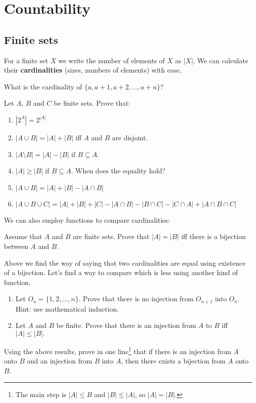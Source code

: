 \section{Countability}
\subsection{Finite sets}
For a finite set $X$ we write the number of elements of $X$ as $|X|$. We can calculate their \textbf{cardinalities} (sizes, numbers of elements) with
ease,
\begin{prob}
	What is the cardinality of $\{a, a+1, a+2, \dots, a+n\}$?
\end{prob}
\begin{prob}
	Let $A,\,B$ and $C$ be finite sets. Prove that:
	\begin{enumerate}
		\item $|2^A|=2^{|A|}$
		\item $|A\cup B|=|A|+|B|$ iff $A$ and $B$ are disjoint.
		\item $|A\setminus B|=|A|-|B|$ if $B\subseteq A.$
		\item $|A| \ge |B|$ if $B\subseteq A$. When does the equality hold?
		\item $|A\cup B| = |A| + |B| - |A\cap B|$
		\item $|A\cup B\cup C| = |A|+|B|+|C| - |A\cap B| - |B\cap C|-|C\cap A| + |A\cap B\cap C|$
	\end{enumerate}
\end{prob}
We can also employ functions to compare cardinalities:
\begin{prob}
	Assume that $A$ and $B$ are finite sets. Prove that $|A|=|B|$ iff there is a bijection between $A$ and $B$.
\end{prob}
\begin{prob}
	Above we find the way of saying that two cardinalities are equal using existence of a bijection. Let's find a way to compare which is less using
	another kind of function.  
	\begin{enumerate}
		\item Let $O_n=\{1,2,\dots,n\}.$ Prove that there is no injection from $O_{n+1}$ into $O_n$. Hint: use mathematical induction.
		\item Let $A$ and $B$ be finite. Prove that there is an injection from $A$ to $B$ iff $|A| \le |B|.$ 
	\end{enumerate}
\end{prob}
\begin{prob}
	Using the above results, prove in one line\footnote{The main step is $|A|\le B$ and $|B|\le |A|$, so $|A|=|B|.$} that if there is an injection from $A$ onto $B$ and an injection from $B$ into $A$, then there exists
	a bijection from $A$ onto $B$.
\end{prob}

